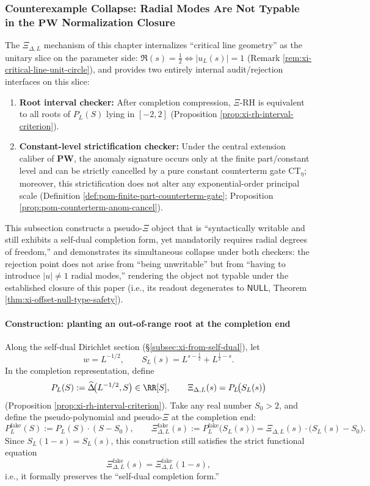 \subsubsection{Counterexample Collapse: Radial Modes Are Not Typable in the \texorpdfstring{$\mathbf{PW}$}{PW} Normalization Closure}\label{subsec:xi-radial-counterexample-collapse}
The \(\Xi_{\Delta,L}\) mechanism of this chapter internalizes ``critical line geometry'' as the unitary slice on the parameter side: \(\Re(s)=\tfrac12\Longleftrightarrow |u_L(s)|=1\) (Remark \ref{rem:xi-critical-line-unit-circle}), and provides two entirely internal audit/rejection interfaces on this slice:
\begin{enumerate}
  \item \textbf{Root interval checker:} After completion compression, \(\Xi\)-RH is equivalent to all roots of \(P_L(S)\) lying in \([-2,2]\) (Proposition \ref{prop:xi-rh-interval-criterion}).
  \item \textbf{Constant-level strictification checker:} Under the central extension caliber of \(\mathbf{PW}\), the anomaly signature occurs only at the finite part/constant level and can be strictly cancelled by a pure constant counterterm gate \(\mathrm{CT}_\eta\); moreover, this strictification does not alter any exponential-order principal scale (Definition \ref{def:pom-finite-part-counterterm-gate}; Proposition \ref{prop:pom-counterterm-anom-cancel}).
\end{enumerate}
This subsection constructs a pseudo-\(\Xi\) object that is ``syntactically writable and still exhibits a self-dual completion form, yet mandatorily requires radial degrees of freedom,'' and demonstrates its simultaneous collapse under both checkers: the rejection point does not arise from ``being unwritable'' but from ``having to introduce \(|u|\neq 1\) radial modes,'' rendering the object not typable under the established closure of this paper (i.e., its readout degenerates to \(\mathsf{NULL}\), Theorem \ref{thm:xi-offset-null-type-safety}).

\paragraph{Construction: planting an out-of-range root at the completion end}
Along the self-dual Dirichlet section (\S\ref{subsec:xi-from-self-dual}), let
\[
w=L^{-1/2},\qquad S_L(s)=L^{s-\tfrac12}+L^{\tfrac12-s}.
\]
In the completion representation, define
\[
P_L(S):=\widehat\Delta\!\bigl(L^{-1/2},S\bigr)\in\RR[S],
\qquad
\Xi_{\Delta,L}(s)=P_L\!\bigl(S_L(s)\bigr)
\]
(Proposition \ref{prop:xi-rh-interval-criterion}).
Take any real number \(S_0>2\), and define the pseudo-polynomial and pseudo-\(\Xi\) at the completion end:
\[
P^{\mathrm{fake}}_L(S):=P_L(S)\cdot (S-S_0),
\qquad
\Xi^{\mathrm{fake}}_{\Delta,L}(s):=P^{\mathrm{fake}}_L\!\bigl(S_L(s)\bigr)
=\Xi_{\Delta,L}(s)\cdot\bigl(S_L(s)-S_0\bigr).
\]
Since \(S_L(1-s)=S_L(s)\), this construction still satisfies the strict functional equation
\[
\Xi^{\mathrm{fake}}_{\Delta,L}(s)=\Xi^{\mathrm{fake}}_{\Delta,L}(1-s),
\]
i.e., it formally preserves the ``self-dual completion form.''

